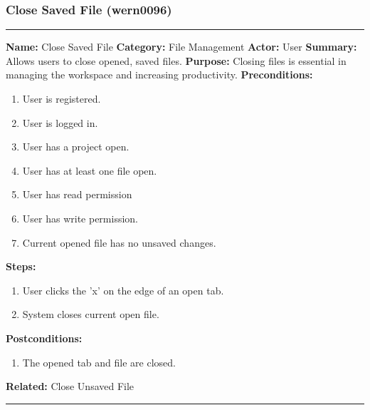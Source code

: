 \documentclass[11pt]{report}
\begin{document}
\subsubsection{Close Saved File (wern0096)}
\vspace{2pt}
\hrule
\vspace{8pt}
	\noindent\textbf{Name:} Close Saved File \newline
	\textbf{Category:} File Management \newline
	\textbf{Actor:} User \newline
	\textbf{Summary:} Allows users to close opened, saved files. \newline
	\textbf{Purpose:} Closing files is essential in managing the workspace and increasing productivity. \newline
	\textbf{Preconditions:}
	\begin{enumerate}
		\item User is registered.
		\item User is logged in.
		\item User has a project open.
		\item User has at least one file open.
		\item User has read permission
		\item User has write permission.
		\item Current opened file has no unsaved changes.
	\end{enumerate}
	\textbf{Steps:}
	\begin{enumerate}
		\item User clicks the 'x' on the edge of an open tab.
		\item System closes current open file.
	\end{enumerate}
	\textbf{Postconditions:}
	\begin{enumerate}
		\item The opened tab and file are closed.
	\end{enumerate}
	\textbf{Related:} Close Unsaved File
\vspace{8pt}
\hrule
\newpage
\end{document}
